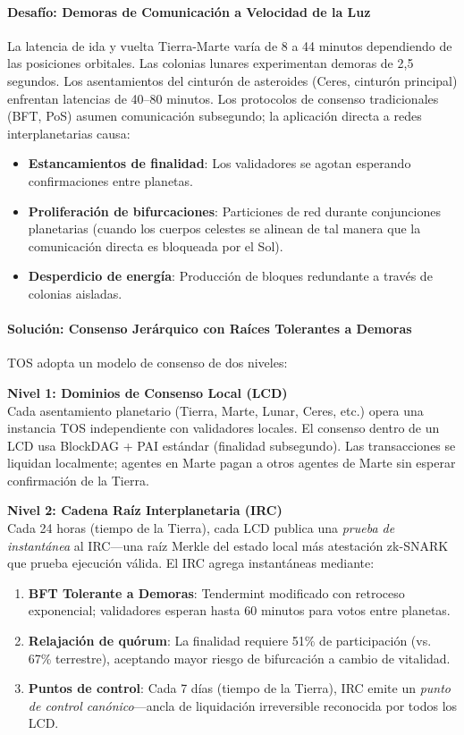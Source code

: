 \documentclass[11pt]{article}
\begin{document}
\paragraph{Desafío: Demoras de Comunicación a Velocidad de la Luz}
La latencia de ida y vuelta Tierra-Marte varía de 8 a 44 minutos dependiendo de las posiciones orbitales. Las colonias lunares experimentan demoras de 2,5 segundos. Los asentamientos del cinturón de asteroides (Ceres, cinturón principal) enfrentan latencias de 40--80 minutos. Los protocolos de consenso tradicionales (BFT, PoS) asumen comunicación subsegundo; la aplicación directa a redes interplanetarias causa:
\begin{itemize}[noitemsep]
  \item \textbf{Estancamientos de finalidad}: Los validadores se agotan esperando confirmaciones entre planetas.
  \item \textbf{Proliferación de bifurcaciones}: Particiones de red durante conjunciones planetarias (cuando los cuerpos celestes se alinean de tal manera que la comunicación directa es bloqueada por el Sol).
  \item \textbf{Desperdicio de energía}: Producción de bloques redundante a través de colonias aisladas.
\end{itemize}

\paragraph{Solución: Consenso Jerárquico con Raíces Tolerantes a Demoras}
TOS adopta un modelo de consenso de dos niveles:

\textbf{Nivel 1: Dominios de Consenso Local (LCD)}\\
Cada asentamiento planetario (Tierra, Marte, Lunar, Ceres, etc.) opera una instancia TOS independiente con validadores locales. El consenso dentro de un LCD usa BlockDAG + PAI estándar (finalidad subsegundo). Las transacciones se liquidan localmente; agentes en Marte pagan a otros agentes de Marte sin esperar confirmación de la Tierra.

\textbf{Nivel 2: Cadena Raíz Interplanetaria (IRC)}\\
Cada 24 horas (tiempo de la Tierra), cada LCD publica una \emph{prueba de instantánea} al IRC—una raíz Merkle del estado local más atestación zk-SNARK que prueba ejecución válida. El IRC agrega instantáneas mediante:
\begin{enumerate}[noitemsep]
  \item \textbf{BFT Tolerante a Demoras}: Tendermint modificado con retroceso exponencial; validadores esperan hasta 60 minutos para votos entre planetas.
  \item \textbf{Relajación de quórum}: La finalidad requiere 51\% de participación (vs. 67\% terrestre), aceptando mayor riesgo de bifurcación a cambio de vitalidad.
  \item \textbf{Puntos de control}: Cada 7 días (tiempo de la Tierra), IRC emite un \emph{punto de control canónico}—ancla de liquidación irreversible reconocida por todos los LCD.
\end{enumerate}
\end{document}

